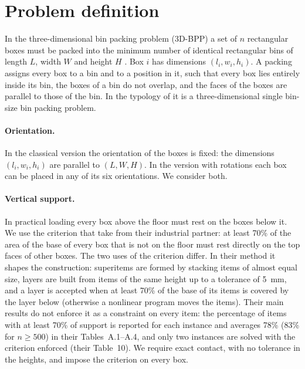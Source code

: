 \section{Problem definition}
\label{sec:problem}

In the three-dimensional bin packing problem (3D-BPP) a set of $n$ rectangular boxes must be packed
into the minimum number of identical rectangular bins of length $L$, width $W$ and height $H$
\citep{Martello2000}. Box $i$ has dimensions $(l_i,w_i,h_i)$. A packing assigns every box to a bin
and to a position in it, such that every box lies entirely inside its bin, the boxes of a bin do not
overlap, and the faces of the boxes are parallel to those of the bin. In the typology of
\citet{Wascher2007} it is a three-dimensional single bin-size bin packing problem.

\paragraph{Orientation.}
In the classical version the orientation of the boxes is fixed: the dimensions $(l_i,w_i,h_i)$ are
parallel to $(L,W,H)$. In the version with rotations each box can be placed in any of its six
orientations. We consider both.

\paragraph{Vertical support.}
In practical loading every box above the floor must rest on the boxes below it. We use the criterion
that \citet{Elhedhli2019} take from their industrial partner: at least 70\% of the area of the base of
every box that is not on the floor must rest directly on the top faces of other boxes. The two uses of
the criterion differ. In their method it shapes the construction: superitems are formed by stacking
items of almost equal size, layers are built from items of the same height up to a tolerance of
5~mm, and a layer is accepted when at least 70\% of the base of its items is covered by the layer
below (otherwise a nonlinear program moves the items). Their main results do not enforce it as a
constraint on every item: the percentage of items with at least 70\% of support is reported for each
instance and averages 78\% (83\% for $n\ge 500$) in their Tables~A.1--A.4, and only two instances are
solved with the criterion enforced (their Table~10). We require exact contact, with no tolerance in the
heights, and impose the criterion on every box.

